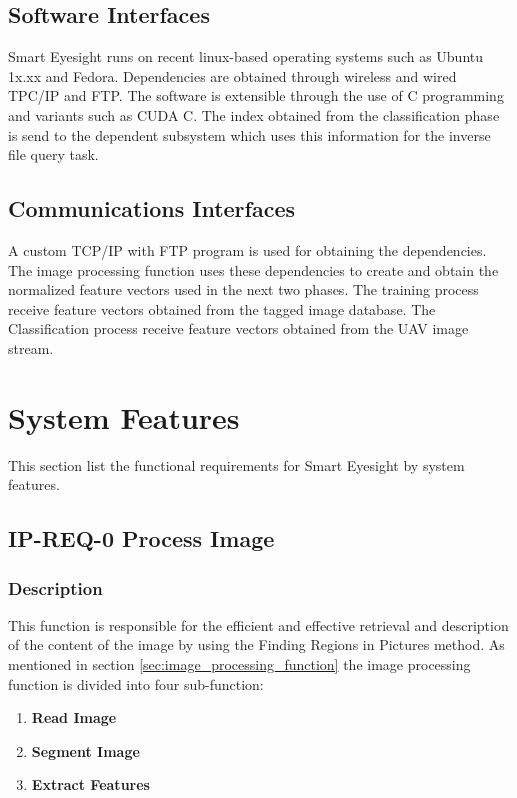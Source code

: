 \documentclass[12pt]{article}
\begin{document}
\subsection{Software Interfaces}
Smart Eyesight runs on recent linux-based operating systems such as
Ubuntu 1x.xx and Fedora. Dependencies are obtained through wireless
and wired TPC/IP and FTP. The software is extensible through the use
of C programming and variants such as CUDA C. The index obtained from
the classification phase is send to the dependent subsystem which uses
this information for the inverse file query task.

\subsection{Communications Interfaces}
A custom TCP/IP with FTP program is used for obtaining the
dependencies. The image processing function uses these dependencies to
create and obtain the normalized feature vectors used in the next two
phases. The training process receive feature vectors obtained from the
tagged image database. The Classification process receive feature
vectors obtained from the UAV image stream.

\section{System Features}
\label{sec:system_features}
This section list the functional requirements for Smart Eyesight by
system features.
\subsection{IP-REQ-0 Process Image}
\label{sec:image_processing_feature}

\subsubsection{Description}
This function is responsible for the efficient and effective retrieval
and description of the content of the image by using the Finding
Regions in Pictures method. As mentioned in section
\ref{sec:image_processing_function} the image processing function is
divided into four sub-function:
\begin{enumerate}
\item \textbf{Read Image}
\item \textbf{Segment Image}
\item \textbf{Extract Features}
\end{enumerate}
\end{document}
